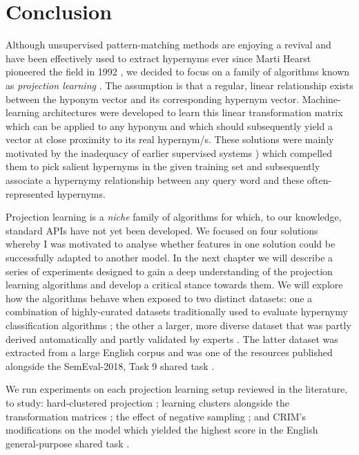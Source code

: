 \section{Conclusion}
Although unsupervised pattern-matching methods are enjoying a revival \citep{roller2018hearst} and have been effectively used to extract hypernyms ever since Marti Hearst pioneered the field in 1992 \citep{hearst1992automatic}, we decided to focus on a family of algorithms known as \textit{projection learning} \citep{ustalov2017negative}.  The assumption is that a regular, linear relationship exists between the hyponym vector and its corresponding hypernym vector.  Machine-learning architectures were developed to learn this linear transformation matrix which can be applied to any hyponym and which should subsequently yield a vector at close proximity to its real hypernym/s.  These solutions were mainly motivated by the inadequacy of earlier supervised systems \citep{baroni2012entailment, weeds2014learning}) which compelled them to pick salient hypernyms in the given training set and subsequently associate a hypernymy relationship between any query word and these often-represented hypernyms.

Projection learning is a \textit{niche} family of algorithms for which, to our knowledge, standard APIs have not yet been developed.  We focused on four solutions whereby I was motivated to analyse whether features in one solution could be successfully adapted to another model. In the next chapter we will describe a series of experiments designed to gain a deep understanding of the projection learning algorithms and develop a critical stance towards them.  We will explore how the algorithms behave when exposed to two distinct datasets: one a combination of highly-curated datasets traditionally used to evaluate hypernymy classification algorithms \citep{Baroni2011, santus2015evalution, santus2016nine, necsulescu2015reading}; the other a larger, more diverse dataset that was partly derived automatically and partly validated by experts \citep{camacho2018semeval}.  The latter dataset was extracted from a large English corpus and was one of the resources published alongside the SemEval-2018, Task 9 shared task \citep{camacho2018semeval}.

We run experiments on each projection learning setup reviewed in the literature, to study: hard-clustered projection \citep{Fu2014}; learning clusters alongside the transformation matrices \citep{yamane2016distributional}; the effect of negative sampling \citep{ustalov2017negative}; and \ac{CRIM}’s modifications on the \citep{yamane2016distributional} model which yielded the highest score in the English general-purpose shared task \citep{bernier2018crim}.  

